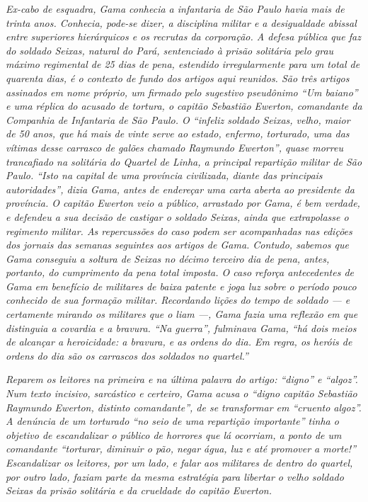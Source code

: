 {\begin{didas}
\emph{Ex-cabo de esquadra, Gama conhecia a infantaria de São Paulo havia
mais de trinta anos. Conhecia, pode-se dizer, a disciplina militar e a
desigualdade abissal entre superiores hierárquicos e os recrutas da
corporação. A defesa pública que faz do soldado Seixas, natural do Pará,
sentenciado à prisão solitária pelo grau máximo regimental de 25 dias de
pena, estendido irregularmente para um total de quarenta dias, é o
contexto de fundo dos artigos aqui reunidos. São três artigos assinados
em nome próprio, um firmado pelo sugestivo pseudônimo ``Um baiano'' e uma
réplica do acusado de tortura, o capitão Sebastião Ewerton, comandante
da Companhia de Infantaria de São Paulo. O ``infeliz soldado Seixas,
velho, maior de 50 anos, que há mais de vinte serve ao estado, enfermo,
torturado, uma das vítimas desse carrasco de galões chamado Raymundo
Ewerton'', quase morreu trancafiado na solitária do Quartel de Linha, a
principal repartição militar de São Paulo. ``Isto na capital de uma
província civilizada, diante das principais autoridades'', dizia Gama,
antes de endereçar uma carta aberta ao presidente da província. O
capitão Ewerton veio a público, arrastado por Gama, é bem verdade, e
defendeu a sua decisão de castigar o soldado Seixas, ainda que
extrapolasse o regimento militar. As repercussões do caso podem ser
acompanhadas nas edições dos jornais das semanas seguintes aos artigos
de Gama. Contudo, sabemos que Gama conseguiu a soltura de Seixas no
décimo terceiro dia de pena, antes, portanto, do cumprimento da pena
total imposta. O caso reforça antecedentes de Gama em benefício de
militares de baixa patente e joga luz sobre o período pouco conhecido de
sua formação militar. Recordando lições do tempo de soldado --- e
certamente mirando os militares que o liam ---, Gama fazia uma reflexão
em que distinguia a covardia e a bravura. ``Na guerra'', fulminava Gama,
``há dois meios de alcançar a heroicidade: a bravura, e as ordens do dia.
Em regra, os heróis de ordens do dia são os carrascos dos soldados no
quartel.''}
\end{didas}



\begin{resumo}
\emph{Reparem os leitores na primeira e na última palavra do artigo:
``digno'' e ``algoz''. Num texto incisivo, sarcástico e certeiro, Gama acusa
o ``digno capitão Sebastião Raymundo Ewerton, distinto comandante'', de se
transformar em ``cruento algoz''. A denúncia de um torturado ``no seio de
uma repartição importante'' tinha o objetivo de escandalizar o público de
horrores que lá ocorriam, a ponto de um comandante ``torturar, diminuir o
pão, negar água, luz e até promover a morte!'' Escandalizar os leitores,
por um lado, e falar aos militares de dentro do quartel, por outro lado,
faziam parte da mesma estratégia para libertar o velho soldado Seixas da
prisão solitária e da crueldade do capitão Ewerton. }
\end{resumo}

}
